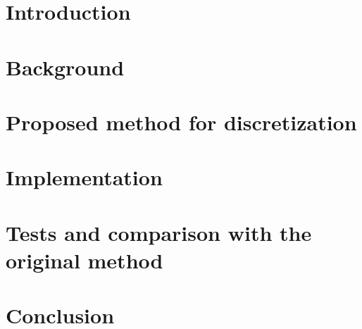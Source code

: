 \documentclass[runningheads,a4paper,11pt]{report}
\begin{document}

\begin{abstract}

\end{abstract}

\tableofcontents

\chapter{Introduction}
\label{sec:intro}


\chapter{Background}
\label{sec:background}


\chapter{Proposed method for discretization}
\label{sec:maths}


\chapter{Implementation}
\label{sec:implementation}


\chapter{Tests and comparison with the original method}
\label{sec:tests}


\chapter{Conclusion}
\label{sec:conclusion}

\end{document}
